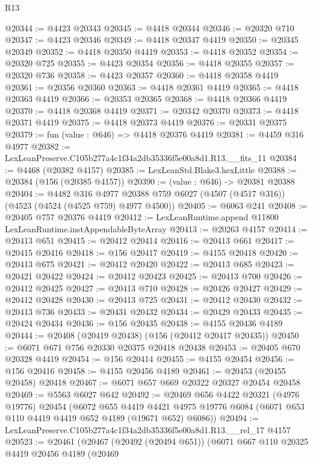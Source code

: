\begin{lexlean}{R13}
\begin{coremodule}
@20344 := @4423 @20343
@20345 := @4418 @20344
@20346 := @20320 @710
@20347 := @4423 @20346
@20349 := @4418 @20347 @4419
@20350 := @20345 @20349
@20352 := @4418 @20350 @4419
@20353 := @4418 @20352
@20354 := @20320 @725
@20355 := @4423 @20354
@20356 := @4418 @20355
@20357 := @20320 @736
@20358 := @4423 @20357
@20360 := @4418 @20358 @4419
@20361 := @20356 @20360
@20363 := @4418 @20361 @4419
@20365 := @4418 @20363 @4419
@20366 := @20353 @20365
@20368 := @4418 @20366 @4419
@20370 := @4418 @20368 @4419
@20371 := @20342 @20370
@20373 := @4418 @20371 @4419
@20375 := @4418 @20373 @4419
@20376 := @20331 @20375
@20379 := fun (value : @646) => @4418 @20376 @4419
@20381 := @4459 @316 @4977
@20382 := LexLeanPreserve.C105b277a4c1f34a2db35336f5e00a8d1.R13.__fits_11
@20384 := @4468 (@20382 @4157)
@20385 := LexLeanStd.Blake3.hexLittle
@20388 := @20384 (@156 (@20385 @4157))
@20390 := (value : @646) -> @20381 @20388
@20404 := @4482
    @316
    @4977
    @20388
    @759
    @6027
    (@4507 (@4517 @316))
    (@4523 (@4524 (@4525 @759) @4977 @4500))
@20405 := @6063 @241
@20408 := @20405 @757 @20376 @4419
@20412 := LexLeanRuntime.append @11800 LexLeanRuntime.instAppendableByteArray
@20413 := @20263 @4157
@20414 := @20413 @651
@20415 := @20412 @20414
@20416 := @20413 @661
@20417 := @20415 @20416
@20418 := @156 @20417
@20419 := @4155 @20418
@20420 := @20413 @675
@20421 := @20412 @20420
@20422 := @20413 @685
@20423 := @20421 @20422
@20424 := @20412 @20423
@20425 := @20413 @700
@20426 := @20412 @20425
@20427 := @20413 @710
@20428 := @20426 @20427
@20429 := @20412 @20428
@20430 := @20413 @725
@20431 := @20412 @20430
@20432 := @20413 @736
@20433 := @20431 @20432
@20434 := @20429 @20433
@20435 := @20424 @20434
@20436 := @156 @20435
@20438 := @4155 @20436 @4189
@20444 := @20408 (@20419 @20438) (@156 (@20412 @20417 @20435))
@20450 := @6071 @671 @756 @20330 @20375 @20418 @20438
@20453 := @20405 @670 @20328 @4419
@20454 := @156 @20414
@20455 := @4155 @20454
@20456 := @156 @20416
@20458 := @4155 @20456 @4189
@20461 := @20453 (@20455 @20458) @20418
@20467 := @6071 @657 @669 @20322 @20327 @20454 @20458
@20469 := @5563 @6027 @642
@20492 := @20469
    @656
    @4422
    @20321
    (@4976 @19776)
    @20454
    (@6072
      @655
      @4419
      @4421
      @4975
      @19776
      @6084
      (@6071 @653 @110 @4419 @4419 @652 @4189 (@19671 @652) @6086))
@20494 := LexLeanPreserve.C105b277a4c1f34a2db35336f5e00a8d1.R13.__rel_17 @4157
@20523 := @20461
    (@20467
      (@20492 (@20494 @651))
      (@6071
        @667
        @110
        @20325
        @4419
        @20456
        @4189
        (@20469

\end{coremodule}
\end{lexlean}
